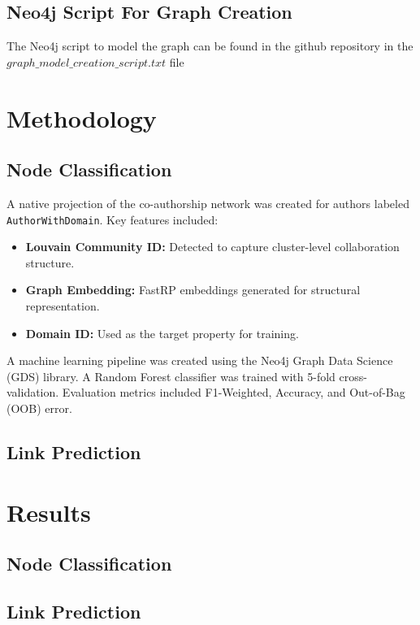 \documentclass[conference, 12pt]{IEEEtran}
\begin{document}
\subsection{Neo4j Script For Graph Creation}
The Neo4j script to model the graph can be found in the github repository
in the $graph\_model\_creation\_script.txt$ file

\section{Methodology}

\subsection{Node Classification}
A native projection of the co-authorship network was created for authors labeled \texttt{AuthorWithDomain}. Key features included:
\begin{itemize}
  \item \textbf{Louvain Community ID:} Detected to capture cluster-level collaboration structure.
  \item \textbf{Graph Embedding:} FastRP embeddings generated for structural representation.
  \item \textbf{Domain ID:} Used as the target property for training.
\end{itemize}

A machine learning pipeline was created using the Neo4j Graph Data Science (GDS) library. A Random Forest classifier was trained with 5-fold cross-validation. Evaluation metrics included F1-Weighted, Accuracy, and Out-of-Bag (OOB) error.

\subsection{Link Prediction}

\section{Results}

\subsection{Node Classification}

\subsection{Link Prediction}
\end{document}
